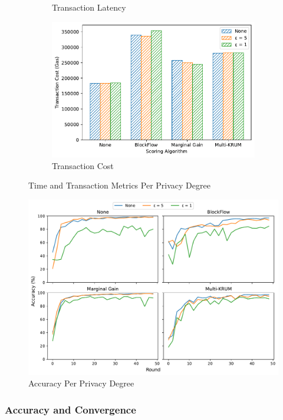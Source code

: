 \begin{figure}[!hpt]
\begin{subfigure}[b]{0.47\textwidth}
        \caption{Transaction Latency}
    \end{subfigure}
    \hfill
    \begin{subfigure}[b]{0.47\textwidth}
        \centering
        \includegraphics[width=\textwidth]{graphics/privacy/tx_cost.pdf}
        \caption{Transaction Cost}
    \end{subfigure}
    \caption{Time and Transaction Metrics Per Privacy Degree}
    \label{fig:priv_metrics}
\end{figure}

\begin{figure}[!hpb]
    \centering
    \includegraphics[width=\textwidth]{graphics/privacy/accuracy.pdf}
    \caption{Accuracy Per Privacy Degree}
    \label{fig:accuracy_privacy}
\end{figure}

\subsubsection{Accuracy and Convergence}


